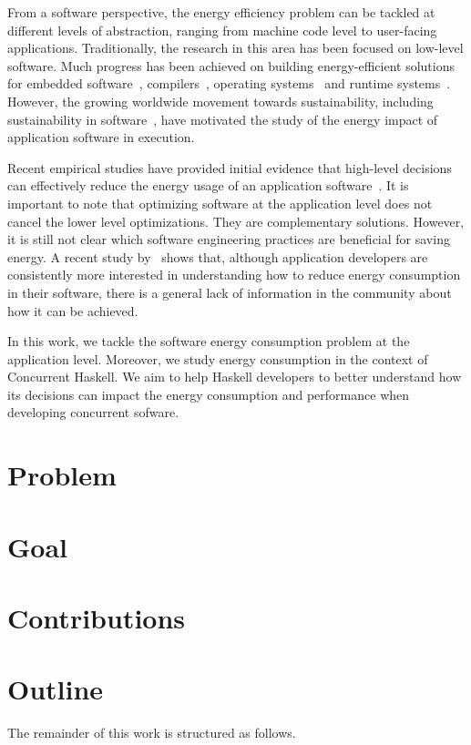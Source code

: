 From a software perspective, the energy efficiency problem can be tackled at different levels of abstraction, ranging from machine code level to user-facing applications. Traditionally, the research in this area has been focused on low-level software. Much progress has been achieved on building energy-efficient solutions for embedded software~\cite{tiwari:1994}, compilers~\cite{hsu:2003}, operating systems~\cite{merkel:2006} and runtime systems~\cite{ribic:2014, farkas:2000}. However, the growing worldwide movement towards sustainability, including sustainability in software~\cite{becker:2015}, have motivated the study of the energy impact of application software in execution.

Recent empirical studies have provided initial evidence that high-level decisions can effectively reduce the energy usage of an application software~\cite{chung:2001,hindle:2012,pinto:2014,trefethen:2013,manotas:2014,sahin:2014}. It is important to note that optimizing software at the application level does not cancel the lower level optimizations. They are complementary solutions. However, it is still not clear which software engineering practices are beneficial for saving energy. A recent study by~ shows that, although application developers are consistently more interested in understanding how to reduce energy consumption in their software, there is a general lack of information in the community about how it can be achieved.

In this work, we tackle the software energy consumption problem at the application level. Moreover, we study energy consumption in the context of Concurrent Haskell. We aim to help Haskell developers to better understand how its decisions can impact the energy consumption and performance when developing  concurrent sofware.


\section{Problem}
\lipsum[1-2]


\section{Goal}
\lipsum[3-4]


\section{Contributions}
\lipsum[7-8]

\section{Outline}
The remainder of this work is structured as follows.

